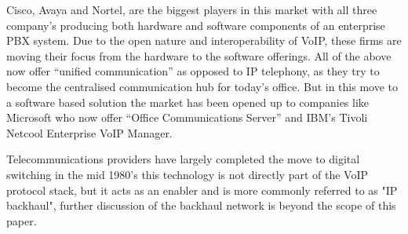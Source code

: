 Cisco, Avaya and Nortel, are the biggest players in this market with all three company's producing both hardware and software components of an enterprise PBX system. Due to the open nature and interoperability of VoIP, these firms are moving their focus from the hardware to the software offerings. All of the above now offer “unified communication” as opposed to IP telephony, as they try to become the centralised communication hub for today's office. But in this move to a software based solution the market has been opened up to companies like Microsoft who now offer “Office Communications Server”\cite{website:microsoft_enter_uc} and IBM’s Tivoli Netcool Enterprise VoIP Manager.

Telecommunications providers have largely completed the move to digital switching in the mid 1980’s\cite{TelecommsSaN05}  this technology is not directly part of the VoIP protocol stack, but it acts as an enabler and is more commonly referred to as "IP backhaul", further discussion of the backhaul network is beyond the scope of this paper.
